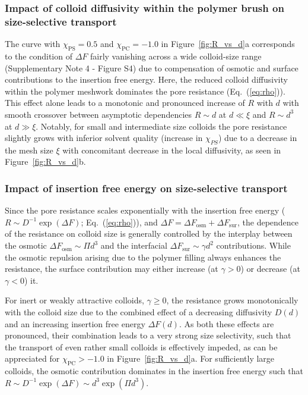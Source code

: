 \documentclass[12pt, a4paper]{article}
\begin{document}
\subsubsection{Impact of colloid diffusivity within the polymer brush on size-selective transport}

The curve with $\chi_{\text{PS}}=0.5$ and $\chi_{\text{PC}} = -1.0$ in Figure~\ref{fig:R_vs_d}a corresponds to the condition of $\Delta F$ fairly vanishing across a wide colloid-size range (Supplementary Note 4 - Figure S4) due to compensation of osmotic and surface contributions to the insertion free energy.
Here, the reduced colloid diffusivity within the polymer meshwork dominates the pore resistance (Eq.~(\ref{eq:rho})). 
This effect alone leads to a monotonic and pronounced increase of $R$ with $d$ with smooth crossover between asymptotic dependencies $R\sim d$ at $d\ll \xi$ and $R\sim d^3$ at $d\gg \xi$. 
Notably, for small and intermediate size colloids the pore resistance slightly grows with inferior solvent quality (increase in $\chi_{PS}$) due to a decrease in the mesh size $\xi$ with concomitant decrease in the local diffusivity, as seen in Figure~\ref{fig:R_vs_d}b.


\subsubsection{Impact of insertion free energy on size-selective transport}

Since the pore resistance scales exponentially with the insertion free energy ($R \sim D^{-1}\exp (\Delta F)$; Eq.~(\ref{eq:rho})), and $\Delta F =\Delta F_{\text{osm}} + \Delta F_{\text{sur}}$, the dependence of the resistance on colloid size is generally controlled by the interplay between
the osmotic $\Delta F_{\text{osm}} \sim \Pi d^3$ and the interfacial $\Delta F_{\text{sur}} \sim \gamma d^2$ contributions. 
While the osmotic repulsion arising due to the polymer filling always enhances the resistance, the surface contribution may either increase (at $\gamma > 0$) or decrease (at $\gamma<0$) it.

For inert or weakly attractive colloids, $\gamma \geq 0$, the resistance grows monotonically with the colloid size due to the combined effect of a decreasing diffusivity $D(d)$ and an increasing insertion free energy  $\Delta F(d)$.
As both these effects are pronounced, their combination leads to a very strong size selectivity, such that the transport of even rather small colloids is effectively impeded, as can be appreciated for $\chi_{\text{PC}} > -1.0$ in Figure~\ref{fig:R_vs_d}a.
For sufficiently large colloids, the osmotic contribution dominates in the insertion free energy such that $R \sim D^{-1} \exp (\Delta F) \sim d^3 \exp (\Pi d^3)$.
\end{document}
